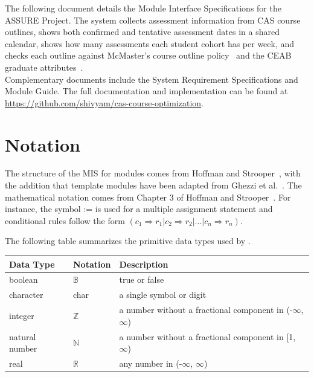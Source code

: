 \documentclass[12pt, titlepage]{article}
\begin{document}


The following document details the Module Interface Specifications for the ASSURE Project. 
The system collects assessment information from CAS course outlines, shows both confirmed 
and tentative assessment dates in a shared calendar, shows how many assessments each 
student cohort has per week, and checks each outline against McMaster's course 
outline policy~\citep{McMasterUCMP2025} and the CEAB graduate attributes~\citep{CEAB2025}.\\

\noindent Complementary documents include the System Requirement Specifications and Module Guide.
The full documentation and implementation can be found at
\url{https://github.com/shivyam/cas-course-optimization}.


\section{Notation} \label{SecNotation}

The structure of the MIS for modules comes from Hoffman and Strooper~\citep{HoffmanAndStrooper1995},
with the addition that template modules have been adapted from
Ghezzi et al.~\citep{GhezziEtAl2003}.  The mathematical notation comes from Chapter 3 of
Hoffman and Strooper~\citep{HoffmanAndStrooper1995}.  For instance, the symbol := is used for a
multiple assignment statement and conditional rules follow the form $(c_1
\Rightarrow r_1 | c_2 \Rightarrow r_2 | ... | c_n \Rightarrow r_n )$.

The following table summarizes the primitive data types used by \progname. 

\begin{center}
\renewcommand{\arraystretch}{1.2}
\noindent 
\begin{tabular}{l l p{7.5cm}} 
\toprule 
\textbf{Data Type} & \textbf{Notation} & \textbf{Description}\\ 
\midrule
boolean & $\mathbb{B}$ & true or false\\
character & char & a single symbol or digit\\
integer & $\mathbb{Z}$ & a number without a fractional component in (-$\infty$, $\infty$) \\
natural number & $\mathbb{N}$ & a number without a fractional component in [1, $\infty$) \\
real & $\mathbb{R}$ & any number in (-$\infty$, $\infty$)\\
\bottomrule
\end{tabular} 
\end{center}
\end{document}
